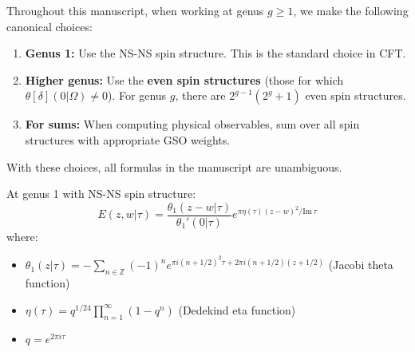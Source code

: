 \begin{remark}\label{rem:canonical-spin-choice}
Throughout this manuscript, when working at genus $g \geq 1$, we make the following 
canonical choices:

\begin{enumerate}
\item \textbf{Genus 1:} Use the NS-NS spin structure. This is the standard choice in CFT.

\item \textbf{Higher genus:} Use the \textbf{even spin structures} (those for which 
$\theta[\delta](0|\Omega) \neq 0$). For genus $g$, there are $2^{g-1}(2^g + 1)$ even 
spin structures.

\item \textbf{For sums:} When computing physical observables, sum over all spin 
structures with appropriate GSO weights.
\end{enumerate}

With these choices, all formulas in the manuscript are unambiguous.
\end{remark}

\begin{proposition}\label{prop:prime-genus-1}
At genus 1 with NS-NS spin structure:
$$E(z,w|\tau) = \frac{\theta_1(z-w|\tau)}{\theta_1'(0|\tau)} 
e^{\pi \eta(\tau) (z-w)^2 / \text{Im}\,\tau}$$
where:
\begin{itemize}
\item $\theta_1(z|\tau) = -\sum_{n \in \mathbb{Z}} (-1)^n e^{\pi i (n+1/2)^2 \tau + 
2\pi i (n+1/2)(z+1/2)}$ (Jacobi theta function)
\item $\eta(\tau) = q^{1/24}\prod_{n=1}^{\infty}(1-q^n)$ (Dedekind eta function)  
\item $q = e^{2\pi i \tau}$
\end{itemize}
\end{proposition}